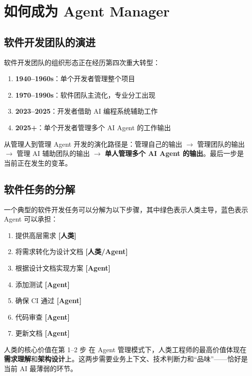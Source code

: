 \section{如何成为 Agent Manager}

\subsection{软件开发团队的演进}

软件开发团队的组织形态正在经历第四次重大转型：

\begin{enumerate}
    \item \textbf{1940--1960s}：单个开发者管理整个项目
    \item \textbf{1970--1990s}：软件团队主流化，专业分工出现
    \item \textbf{2023--2025}：开发者借助 AI 编程系统辅助工作
    \item \textbf{2025+}：单个开发者管理多个 AI Agent 的工作输出
\end{enumerate}

\begin{importantbox}{从管理人到管理 Agent}
开发的演化路径是：管理自己的输出 $\rightarrow$ 管理团队的输出 $\rightarrow$ 管理 AI 辅助团队的输出 $\rightarrow$ \textbf{单人管理多个 AI Agent 的输出}。最后一步是当前正在发生的变革。
\end{importantbox}

\subsection{软件任务的分解}

一个典型的软件开发任务可以分解为以下步骤，其中绿色表示人类主导，蓝色表示 Agent 可以承担：

\begin{enumerate}
    \item 提供高层需求 \textbf{{[}人类{]}}
    \item 将需求转化为设计文档 \textbf{{[}人类/Agent{]}}
    \item 根据设计文档实现方案 \textbf{{[}Agent{]}}
    \item 添加测试 \textbf{{[}Agent{]}}
    \item 确保 CI 通过 \textbf{{[}Agent{]}}
    \item 代码审查 \textbf{{[}Agent{]}}
    \item 更新文档 \textbf{{[}Agent{]}}
\end{enumerate}

\begin{knowledgebox}{人类的核心价值在第 1--2 步}
在 Agent 管理模式下，人类工程师的最高价值体现在\textbf{需求理解}和\textbf{架构设计}上。这两步需要业务上下文、技术判断力和``品味''——恰好是当前 AI 最薄弱的环节。
\end{knowledgebox}

